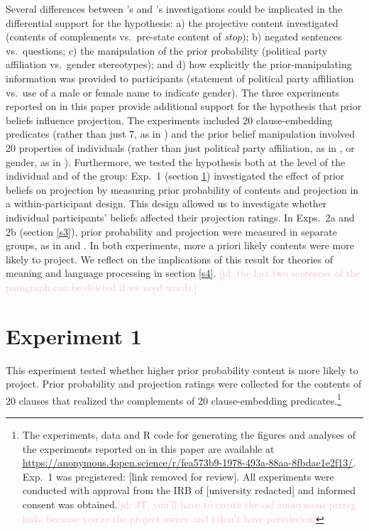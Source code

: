 \documentclass[11pt,fleqn]{article}
\newcommand{\jd}[1]{\textcolor{Pink}{[jd: #1]}}
\newcommand{\6}{\mbox{$[\hspace*{-.6mm}[$}}
\newcommand{\9}{\mbox{$]\hspace*{-.6mm}]$}}
\newcommand{\citeposs}[1]{\citeauthor{#1}'s}
\begin{document}
Several differences between \citeposs{mahler2020} and \citeposs{lorson2018} investigations could be implicated in the differential support for the hypothesis: a) the projective content investigated (contents of complements vs.\ pre-state content of {\em stop}); b) negated sentences vs.\ questions; c) the manipulation of the prior probability (political party affiliation vs.\ gender stereotypes); and d) how explicitly the prior-manipulating information was provided to participants (statement of political party affiliation vs.\  use of a male or female name to indicate gender). The three experiments reported on in this paper provide additional support for the hypothesis that prior beliefs influence projection. The experiments included 20 clause-embedding predicates (rather than just 7, as in ) and the prior belief manipulation involved 20 properties of individuals (rather than just political party affiliation, as in , or gender, as in ). Furthermore, we tested the hypothesis both at the level of the individual and of the group: Exp.~1 (section \ref{s2}) investigated the effect of prior beliefs on projection by measuring prior probability of contents and projection in a within-participant design. This design allowed us to investigate whether individual participants' beliefs affected their projection ratings. In Exps.~2a and 2b (section \ref{s3}), prior probability and projection were measured in separate groups, as in  and . In both experiments, more a priori likely contents were more likely to project. We reflect on the implications of this result for theories of meaning and language processing in section \ref{s4}. \jd{the last two sentences of the paragraph can be deleted if we need words.}

\section{Experiment 1}\label{s2}

This experiment tested whether higher prior probability content is more likely to project. Prior probability and projection ratings were collected for the contents of 20 clauses that realized the complements of 20 clause-embedding predicates.\footnote{\label{f-github}The experiments, data and R code for generating the figures and analyses of the experiments reported on in this paper are available at \url{https://anonymous.4open.science/r/fea573b9-1978-493a-88aa-8fbdae1e2f13/}. Exp.~1 was pregistered: [link removed for review]. All experiments were conducted with approval from the IRB of [university redacted] and informed consent was obtained.\jd{JT, you'll have to create the osf anonymous prereg links because you're the project owner and i don't have permission}}
\end{document}
